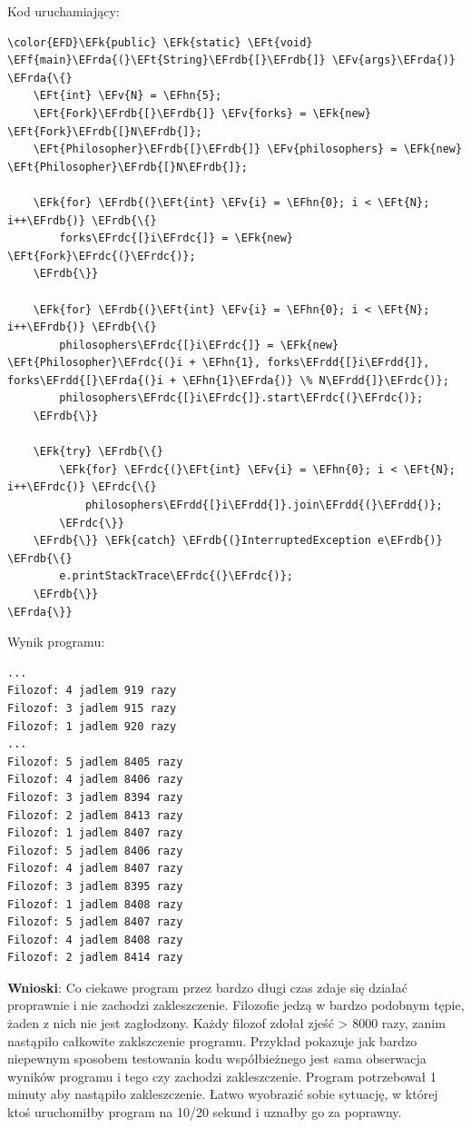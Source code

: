 \documentclass[11pt]{article}
\newcommand{\EFk}[1]{\textcolor{EFk}{#1}} %
\newcommand{\EFf}[1]{\textcolor{EFf}{#1}} %
\newcommand{\EFv}[1]{\textcolor{EFv}{#1}} %
\newcommand{\EFt}[1]{\textcolor{EFt}{#1}} %
\newcommand{\EFhn}[1]{\textcolor{EFhn}{#1}} %
\newcommand{\EFrda}[1]{\textcolor{EFrda}{#1}} %
\newcommand{\EFrdb}[1]{\textcolor{EFrdb}{#1}} %
\newcommand{\EFrdc}[1]{\textcolor{EFrdc}{#1}} %
\newcommand{\EFrdd}[1]{\textcolor{EFrdd}{#1}} %
\begin{document}
Kod uruchamiający:
\begin{Code}
\begin{Verbatim}
\color{EFD}\EFk{public} \EFk{static} \EFt{void} \EFf{main}\EFrda{(}\EFt{String}\EFrdb{[}\EFrdb{]} \EFv{args}\EFrda{)} \EFrda{\{}
    \EFt{int} \EFv{N} = \EFhn{5};
    \EFt{Fork}\EFrdb{[}\EFrdb{]} \EFv{forks} = \EFk{new} \EFt{Fork}\EFrdb{[}N\EFrdb{]};
    \EFt{Philosopher}\EFrdb{[}\EFrdb{]} \EFv{philosophers} = \EFk{new} \EFt{Philosopher}\EFrdb{[}N\EFrdb{]};

    \EFk{for} \EFrdb{(}\EFt{int} \EFv{i} = \EFhn{0}; i < \EFt{N}; i++\EFrdb{)} \EFrdb{\{}
        forks\EFrdc{[}i\EFrdc{]} = \EFk{new} \EFt{Fork}\EFrdc{(}\EFrdc{)};
    \EFrdb{\}}

    \EFk{for} \EFrdb{(}\EFt{int} \EFv{i} = \EFhn{0}; i < \EFt{N}; i++\EFrdb{)} \EFrdb{\{}
        philosophers\EFrdc{[}i\EFrdc{]} = \EFk{new} \EFt{Philosopher}\EFrdc{(}i + \EFhn{1}, forks\EFrdd{[}i\EFrdd{]}, forks\EFrdd{[}\EFrda{(}i + \EFhn{1}\EFrda{)} \% N\EFrdd{]}\EFrdc{)};
        philosophers\EFrdc{[}i\EFrdc{]}.start\EFrdc{(}\EFrdc{)};
    \EFrdb{\}}

    \EFk{try} \EFrdb{\{}
        \EFk{for} \EFrdc{(}\EFt{int} \EFv{i} = \EFhn{0}; i < \EFt{N}; i++\EFrdc{)} \EFrdc{\{}
            philosophers\EFrdd{[}i\EFrdd{]}.join\EFrdd{(}\EFrdd{)};
        \EFrdc{\}}
    \EFrdb{\}} \EFk{catch} \EFrdb{(}InterruptedException e\EFrdb{)} \EFrdb{\{}
        e.printStackTrace\EFrdc{(}\EFrdc{)};
    \EFrdb{\}}
\EFrda{\}}
\end{Verbatim}
\end{Code}

Wynik programu:
\begin{tcolorbox}
\begin{Verbatim}
...
Filozof: 4 jadlem 919 razy
Filozof: 3 jadlem 915 razy
Filozof: 1 jadlem 920 razy
...
Filozof: 5 jadlem 8405 razy
Filozof: 4 jadlem 8406 razy
Filozof: 3 jadlem 8394 razy
Filozof: 2 jadlem 8413 razy
Filozof: 1 jadlem 8407 razy
Filozof: 5 jadlem 8406 razy
Filozof: 4 jadlem 8407 razy
Filozof: 3 jadlem 8395 razy
Filozof: 1 jadlem 8408 razy
Filozof: 5 jadlem 8407 razy
Filozof: 4 jadlem 8408 razy
Filozof: 2 jadlem 8414 razy
\end{Verbatim}


\end{tcolorbox}\textbf{Wnioski}: Co ciekawe program przez bardzo długi czas zdaje się działać proprawnie i nie zachodzi zakleszczenie.
Filozofie jedzą w bardzo podobnym tępie, żaden z nich nie jest zagłodzony.
Każdy filozof zdołał zjeść > 8000 razy, zanim nastąpiło całkowite zaklszczenie programu.
Przykład pokazuje jak bardzo niepewnym sposobem testowania kodu współbieżnego jest sama obserwacja wyników
programu i tego czy zachodzi zakleszczenie. Program potrzebował 1 minuty aby nastąpiło zakleszczenie.
Łatwo wyobrazić sobie sytuację, w której ktoś uruchomiłby program na 10/20 sekund i uznałby go za poprawny.
\end{document}
